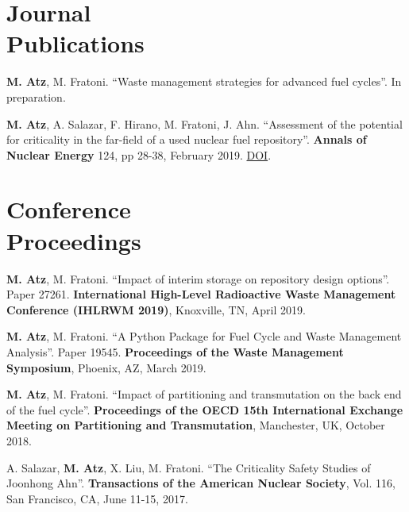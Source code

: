\documentclass[margin,line]{resume}
\begin{document}
\begin{resume}
\section{\mysidestyle Journal\\Publications}
\begin{bibenum}

    \item \textbf{M. Atz}, M. Fratoni. ``Waste management strategies for advanced fuel cycles''. In preparation.

    \item \textbf{M. Atz}, A. Salazar, F. Hirano, M. Fratoni, J. Ahn. ``Assessment of the potential for criticality in the far-field of a used nuclear fuel repository''. \textbf{Annals of Nuclear Energy} 124, pp 28-38, February 2019. \href{https://doi.org/10.1016/j.anucene.2018.09.028}{DOI}.
    
\end{bibenum}
\section{\mysidestyle Conference\\Proceedings}
\begin{bibenum}

    \item \textbf{M. Atz}, M. Fratoni. ``Impact of interim storage on repository design options''. Paper 27261. \textbf{International High-Level Radioactive Waste Management Conference (IHLRWM 2019)}, Knoxville, TN, April 2019.
    
    \item \textbf{M. Atz}, M. Fratoni. ``A Python Package for Fuel Cycle and Waste Management Analysis''. Paper 19545. \textbf{Proceedings of the Waste Management Symposium}, Phoenix, AZ, March 2019.
    
    \item \textbf{M. Atz}, M. Fratoni. ``Impact of partitioning and transmutation on the back end of the fuel cycle''. \textbf{Proceedings of the OECD 15th International Exchange Meeting on Partitioning and Transmutation}, Manchester, UK, October 2018.
    
    \item A. Salazar, \textbf{M. Atz}, X. Liu, M. Fratoni. ``The Criticality Safety Studies of Joonhong Ahn''. \textbf{Transactions of the American Nuclear Society}, Vol. 116, San Francisco, CA, June 11-15, 2017.


\end{bibenum}
\end{resume}
\end{document}
